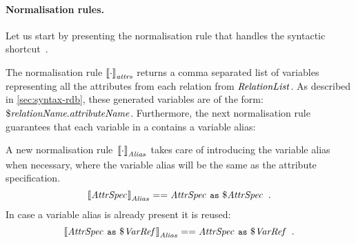 \paragraph{Normalisation rules.}
%
Let us start by presenting the normalisation rule that handles the syntactic shortcut~\lit{\FOR *}.
%
\begin{normalisationrule}%
  \label{for_star-rdb}%
\end{normalisationrule}%
% 
The normalisation rule $\left\llbracket{\cdot}\right\rrbracket_{\mathit{attrs}}$ returns a comma separated list of variables representing all the attributes
from each relation from $\mathit{{RelationList}_{}}$.  As described in \cref{sec:syntax-rdb}, these generated
variables are of the form: $\$\mathit{{\textit{relationName}}.{\textit{attributeName}}}$.
%
Furthermore, the next normalisation rule guarantees that each variable in a \SQLForClause contains a variable alias:
%
\begin{normalisationrule}
  \label{posvar-sql-normalisation1}%
\end{normalisationrule}%
%
A new normalisation rule~$\left\llbracket{\cdot}\right\rrbracket_{\mathit{\mathit{{Alias}_{}}}}$ takes care of introducing the variable alias when necessary,
where the variable alias will be the same as the attribute specification.
%
{\small
  \[
  \left\llbracket{\ensuremath{\mathit{{AttrSpec}_{}}}}\right\rrbracket_{\mathit{\mathit{{Alias}_{}}}} == \mathit{{AttrSpec}_{}}~\texttt{{\small as}}~\mathit{{\$\mathit{AttrSpec}}_{}} \enspace
  .
\]}%
%
In case a variable alias is already present it is reused: 
%
{\small
  \[
  \left\llbracket{\ensuremath{\mathit{{AttrSpec}_{}}}~\texttt{{\small as}}~\ensuremath{\mathit{{\$\mathit{VarRef}}_{}}}}\right\rrbracket_{\mathit{\mathit{{Alias}_{}}}} ==
  \mathit{{AttrSpec}_{}}~\texttt{{\small as}}~\mathit{{\$\mathit{VarRef}}_{}} \enspace .
  \]}%


